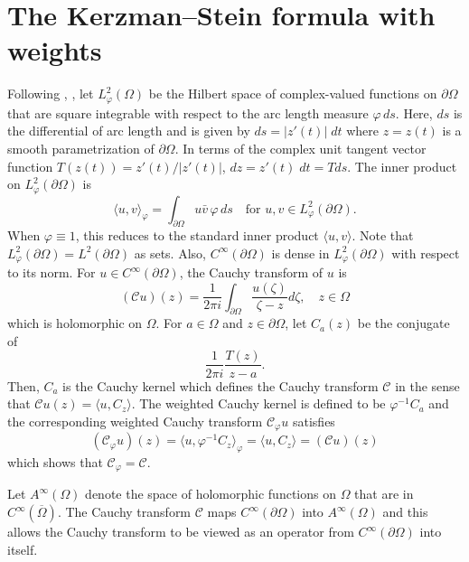 \documentclass[11pt, reqno]{amsart}
\numberwithin{equation}{section}
\newcommand{\ov}{\overline}
\begin{document}
\section{The Kerzman--Stein formula with weights}\label{Kerzman-Stein}

Following \cite{Be0}, \cite{Be1}, let $L^2_{\varphi}(\Omega)$ be the Hilbert space of complex-valued functions on $\partial\Omega$ that are square integrable with respect to the arc length measure $\varphi\,ds$. Here, $ds$ is the differential of arc length and is given by  $ds = \vert z'(t) \vert \; dt$ where $z = z(t)$ is a smooth parametrization of $\partial \Omega$. In terms of the complex unit tangent vector function $T(z(t)) = z'(t) / \vert z'(t) \vert$, $dz = z'(t) \; dt = T ds$. The inner product on $L^2_{\varphi}(\partial\Omega)$ is
\[
\langle u,v\rangle_{\varphi}=\int_{\partial\Omega}u\bar{v}\,\varphi\,ds\quad \text{for }u,v\in L^2_{\varphi}(\partial\Omega).
\]
When $\varphi \equiv 1$, this reduces to the standard inner product $\langle u, v \rangle$. Note that $L^2_{\varphi}(\partial\Omega)=L^2(\partial\Omega)$ as sets. Also, $C^{\infty}(\partial\Omega)$ is dense in $L^2_{\varphi}(\partial\Omega)$ with respect to its norm. For $u\in C^{\infty}(\partial\Omega)$, the Cauchy transform of $u$ is 
\[
(\mathcal{C}u)(z)=\frac{1}{2\pi i}\int_{\partial\Omega}\frac{u(\zeta)}{\zeta-z}d\zeta,\quad z\in\Omega
\]
which is holomorphic on $\Omega$. For $a \in \Omega$ and $z \in \partial \Omega$, let $C_a(z)$ be the conjugate of 
\[
\frac{1}{2 \pi i} \frac{T(z)}{z-a}.
\]
Then, $C_a$ is the Cauchy kernel which defines the Cauchy transform $\mathcal C$ in the sense that $\mathcal C u(z) = \langle u, C_z \rangle$. The weighted Cauchy kernel is defined to be $\varphi^{-1} C_a$ and the corresponding weighted Cauchy transform $\mathcal C_{\varphi}u$ satisfies
\[
(\mathcal C_{\varphi} u)(z) = \langle u, \varphi^{-1} C_z \rangle_{\varphi} = \langle u, C_z \rangle = (\mathcal C u)(z)
\]
which shows that $\mathcal C_{\varphi} = \mathcal C$.

\medskip

Let $A^{\infty}(\Omega)$ denote the space of holomorphic functions on $\Omega$ that are in $C^{\infty}(\ov{\Omega})$. The Cauchy transform $\mathcal C$ maps $C^{\infty}(\partial\Omega)$ into $A^{\infty}(\Omega)$  and this allows the Cauchy transform to be viewed as an operator from $C^{\infty}(\partial\Omega)$ into itself.

\medskip
\end{document}
